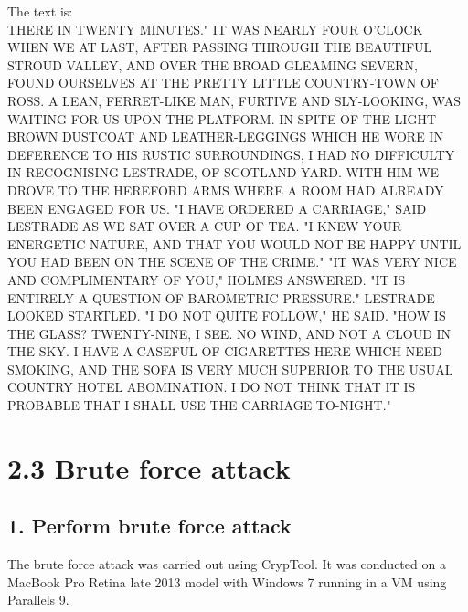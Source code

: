 The text is: \\
THERE IN TWENTY MINUTES."
IT WAS NEARLY FOUR O'CLOCK WHEN WE AT LAST, AFTER PASSING THROUGH
THE BEAUTIFUL STROUD VALLEY, AND OVER THE BROAD GLEAMING SEVERN,
FOUND OURSELVES AT THE PRETTY LITTLE COUNTRY-TOWN OF ROSS. A
LEAN, FERRET-LIKE MAN, FURTIVE AND SLY-LOOKING, WAS WAITING FOR
US UPON THE PLATFORM. IN SPITE OF THE LIGHT BROWN DUSTCOAT AND
LEATHER-LEGGINGS WHICH HE WORE IN DEFERENCE TO HIS RUSTIC
SURROUNDINGS, I HAD NO DIFFICULTY IN RECOGNISING LESTRADE, OF
SCOTLAND YARD. WITH HIM WE DROVE TO THE HEREFORD ARMS WHERE A
ROOM HAD ALREADY BEEN ENGAGED FOR US.
"I HAVE ORDERED A CARRIAGE," SAID LESTRADE AS WE SAT OVER A CUP
OF TEA. "I KNEW YOUR ENERGETIC NATURE, AND THAT YOU WOULD NOT BE
HAPPY UNTIL YOU HAD BEEN ON THE SCENE OF THE CRIME."
"IT WAS VERY NICE AND COMPLIMENTARY OF YOU," HOLMES ANSWERED. "IT
IS ENTIRELY A QUESTION OF BAROMETRIC PRESSURE."
LESTRADE LOOKED STARTLED. "I DO NOT QUITE FOLLOW," HE SAID.
"HOW IS THE GLASS? TWENTY-NINE, I SEE. NO WIND, AND NOT A CLOUD
IN THE SKY. I HAVE A CASEFUL OF CIGARETTES HERE WHICH NEED
SMOKING, AND THE SOFA IS VERY MUCH SUPERIOR TO THE USUAL COUNTRY
HOTEL ABOMINATION. I DO NOT THINK THAT IT IS PROBABLE THAT I
SHALL USE THE CARRIAGE TO-NIGHT."

\section*{2.3 Brute force attack}

\subsection*{1. Perform brute force attack}

The brute force attack was carried out using CrypTool.
It was conducted on a MacBook Pro Retina late 2013 model with Windows 7 running in a VM using Parallels 9.

